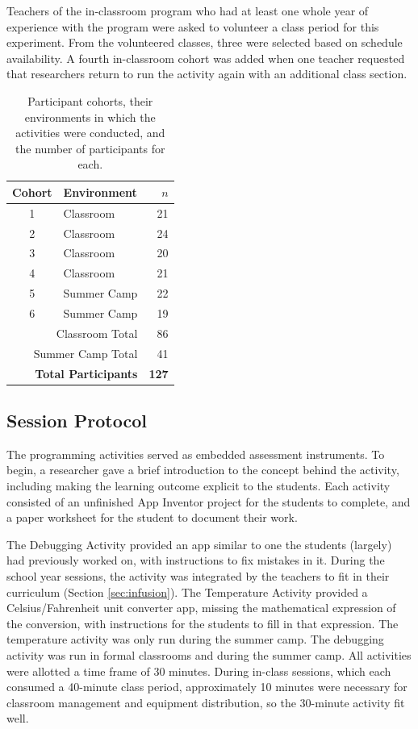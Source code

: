Teachers of the in-classroom program who had at least one whole year of experience with the program were asked to volunteer a class period for this experiment. From the volunteered classes, three were selected based on schedule availability. A fourth in-classroom cohort was added when one teacher requested that researchers return to run the activity again with an additional class section.

\begin{table}
\begin{centering}
	\begin{tabular}{clr}
	Cohort & Environment & $n$ \\
	\hline
	1 & Classroom & 21		\\
	2 & Classroom & 24		\\
	3 & Classroom & 20		\\
	4 & Classroom & 21		\\
	5 & Summer Camp & 22	\\
	6 & Summer Camp & 19	\\ \hline
	\multicolumn{2}{r}{Classroom Total} & 86 \\
	\multicolumn{2}{r}{Summer Camp Total} & 41 \\ \hline \hline
	\multicolumn{2}{r}{\textbf{Total Participants}} & \textbf{127} \\ 
	
	\end{tabular}
	\caption[Participant Cohorts]{Participant cohorts, their environments in which the activities were conducted, and the number of participants for each.}
	\label{tab:cohorts}
\end{centering}
\end{table}


\subsection{Session Protocol}
The programming activities served as embedded assessment instruments. To begin, a researcher gave a brief introduction to the concept behind the activity, including making the learning outcome explicit to the students. Each activity consisted of an unfinished App Inventor project for the students to complete, and a paper worksheet for the student to document their work. 

The Debugging Activity provided an app similar to one the students (largely) had previously worked on, with instructions to fix mistakes in it. During the school year sessions, the activity was integrated by the teachers to fit in their curriculum (Section \ref{sec:infusion}). The Temperature Activity provided a Celsius/Fahrenheit unit converter app, missing the mathematical expression of the conversion, with instructions for the students to fill in that expression. The temperature activity was only run during the summer camp. The debugging activity was run in formal classrooms and during the summer camp. All activities were allotted a time frame of 30 minutes. During in-class sessions, which each consumed a 40-minute class period, approximately 10 minutes were necessary for classroom management and equipment distribution, so the 30-minute activity fit well. 

